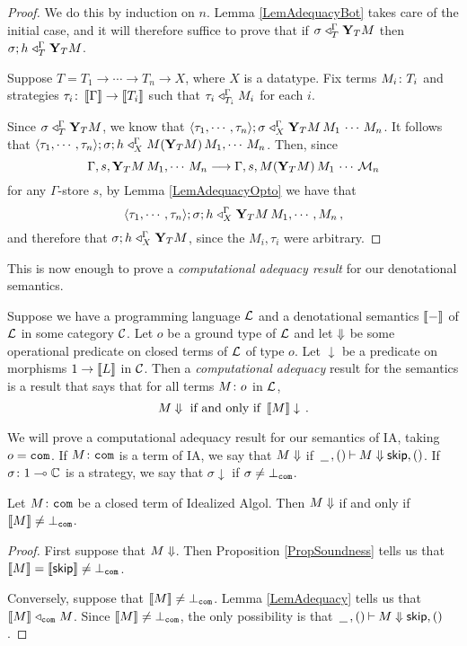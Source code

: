 \begin{proof}
  We do this by induction on $n$.  
  Lemma \ref{LemAdequacyBot} takes care of the initial case, and it will therefore suffice to prove that if $\sigma\mathrel{\triangleleft}_T^\Gamma \mathbf{Y}_T M$ then $\sigma;h\mathrel{\triangleleft}_T^\Gamma \mathbf{Y}_T M$.

  Suppose $T=T_1\to \cdots\to T_n \to X$, where $X$ is a datatype.
  Fix terms $M_i\colon T_i$ and strategies $\tau_i\colon \left\llbracket\Gamma\right\rrbracket\to \left\llbracket T_i\right\rrbracket$ such that $\tau_i\mathrel{\triangleleft}_{T_i}^\Gamma M_i$ for each $i$.

  Since $\sigma\mathrel{\triangleleft}_T^\Gamma \mathbf{Y}_T M$, we know that $\langle \tau_1,\cdots,\tau_n\rangle;\sigma \mathrel{\triangleleft}_X^\Gamma \mathbf{Y}_T M\,M_1\,\cdots\,M_n$.
  It follows that $\langle \tau_1,\cdots,\tau_n\rangle;\sigma;h \mathrel{\triangleleft}_X^\Gamma M(\mathbf{Y}_T M)\,M_1,\cdots\,M_n$.  
  Then, since
  \[
    \Gamma,s,\mathbf{Y}_T M\,M_1,\cdots\,M_n\longrightarrow\Gamma,s,M(\mathbf{Y}_T M)\,M_1\,\cdots\,\mathcal M_n
    \]
  for any $\Gamma$-store $s$, by Lemma \ref{LemAdequacyOpto} we have that
  \[
    \langle\tau_1,\cdots,\tau_n\rangle;\sigma;h \mathrel{\triangleleft}_X^\Gamma \mathbf{Y}_T M\,M_1,\cdots,M_n\,,
    \]
  and therefore that $\sigma;h\mathrel{\triangleleft}_X^\Gamma \mathbf{Y}_T M$, since the $M_i,\tau_i$ were arbitrary.
\end{proof}

This is now enough to prove a \emph{computational adequacy result} for our denotational semantics.

\begin{definition}
  Suppose we have a programming language $\mathcal L$ and a denotational semantics $\left\llbracket-\right\rrbracket$ of $\mathcal L$ in some category ${\mathcal{C}}$.  
  Let $o$ be a ground type of $\mathcal L$ and let $\Downarrow$ be some operational predicate on closed terms of $\mathcal L$ of type $o$.  
  Let $\downarrow$ be a predicate on morphisms $1 \to \left\llbracket L\right\rrbracket$ in ${\mathcal{C}}$.  
  Then a \emph{computational adequacy} result for the semantics is a result that says that for all terms $M\colon o$ in $\mathcal L$, 
  \[
    M\Downarrow \text{ if and only if } \left\llbracket M\right\rrbracket\downarrow\,.
    \]
\end{definition}

We will prove a computational adequacy result for our semantics of IA, taking $o={\mathtt{com}}$.  
If $M\colon{\mathtt{com}}$ is a term of IA, we say that $M\Downarrow$ if $\,\underline{\hspace{1.5ex}}\,,()\mathbin{\vdash} M\Downarrow {\mathsf{skip}},()$.
If $\sigma\colon 1 \multimap \mathbb{C}$ is a strategy, we say that $\sigma\downarrow$ if $\sigma\ne\bot_{{\mathtt{com}}}$.

\begin{theorem}
  Let $M\colon{\mathtt{com}}$ be a closed term of Idealized Algol.
  Then $M\Downarrow$ if and only if $\left\llbracket M\right\rrbracket\ne\bot_{{\mathtt{com}}}$.
  \label{TheComputationalAdequacyIA}
\end{theorem}
\begin{proof}
  First suppose that $M\Downarrow$.  
  Then Proposition \ref{PropSoundness} tells us that $\left\llbracket M\right\rrbracket = \left\llbracket{\mathsf{skip}}\right\rrbracket\ne\bot_{{\mathtt{com}}}$.

  Conversely, suppose that $\left\llbracket M\right\rrbracket\ne\bot_{{\mathtt{com}}}$.  
  Lemma \ref{LemAdequacy} tells us that $\left\llbracket M\right\rrbracket\mathrel{\triangleleft}_{{\mathtt{com}}} M$.  
  Since $\left\llbracket M\right\rrbracket\ne\bot_{{\mathtt{com}}}$, the only possibility is that $\,\underline{\hspace{1.5ex}}\,,()\mathbin{\vdash} M\Downarrow{\mathsf{skip}},()$.
\end{proof}

